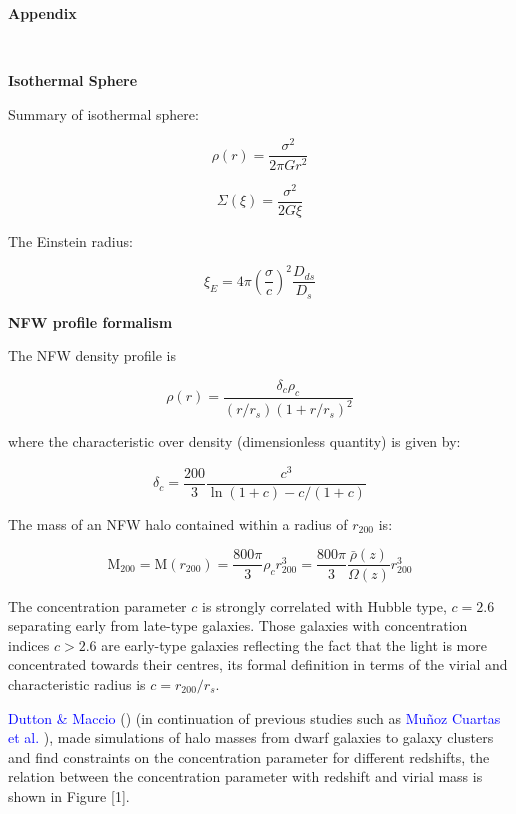 \newpage
{} 
\begin{appendices}
\textbf{{\LARGE Appendix}}

$\qquad$

\textbf{Isothermal Sphere} 

Summary of isothermal sphere:

\begin{equation}
\rho(r)=\frac{\sigma^2}{2\pi Gr^2}
\end{equation}

\begin{equation}
\Sigma(\xi)=\frac{\sigma^2}{2G\xi}
\end{equation}

The Einstein radius:

\begin{equation}
\xi_{E}=4\pi\left(\frac{\sigma}{c}\right)^{2}\frac{D_{ds}}{D_{s}}
\end{equation} 
 
\textbf{NFW profile formalism}
 
The NFW density profile is 

\begin{equation}
\rho(r)=\frac{\delta_{c}\rho_{c}}{(r/r_{s})(1+r/r_{s})^{2}}
\end{equation}

where the characteristic over density (dimensionless quantity) is given by:

\begin{equation}
\delta_{c}=\frac{200}{3}\frac{c^{3}}{\ln{(1+c)}-c/(1+c)}
\end{equation}

The mass of an NFW halo contained within a radius of $r_{200}$ is:

\begin{equation}
\text{M}_{200}=\text{M}(r_{200})=\frac{800\pi}{3}\rho_{c}r^{3}_{200}=\frac{800\pi}{3}\frac{\bar{\rho}(z)}{\Omega(z)}r^{3}_{200}
\end{equation}

The concentration parameter $c$ is strongly correlated with Hubble type, $c=2.6$ separating early from late-type galaxies. Those galaxies with concentration indices $c>2.6$ are early-type galaxies reflecting the fact that the light is more concentrated towards their centres, its formal definition in terms of the virial and characteristic radius is $c=r_{200}/r_{s}$.

\textcolor{blue}{Dutton \& Maccio} (\citeyear{Reference23}) (in continuation of previous studies such as \textcolor{blue}{Mu\~noz Cuartas et al.} \citeyear{Reference12}), made simulations of halo masses from dwarf galaxies to galaxy clusters and find constraints on the concentration parameter for different redshifts, the relation between the concentration parameter with redshift and virial mass is shown in Figure [1].


\end{appendices}

